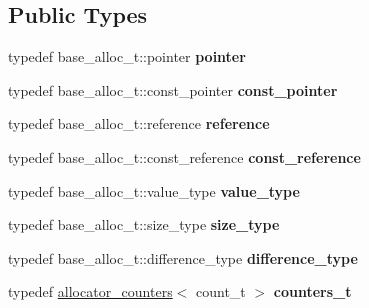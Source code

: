 \subsection*{Public Types}
\begin{DoxyCompactItemize}
\item 
\hypertarget{classstatic__counting__allocator_aac6ab247c85bf6f41751b2b67b6e6026}{}typedef base\+\_\+alloc\+\_\+t\+::pointer {\bfseries pointer}\label{classstatic__counting__allocator_aac6ab247c85bf6f41751b2b67b6e6026}

\item 
\hypertarget{classstatic__counting__allocator_a56eca0942866c703fb43023f23c78982}{}typedef base\+\_\+alloc\+\_\+t\+::const\+\_\+pointer {\bfseries const\+\_\+pointer}\label{classstatic__counting__allocator_a56eca0942866c703fb43023f23c78982}

\item 
\hypertarget{classstatic__counting__allocator_a961e4ec094176c21aa0bbc9b832dcceb}{}typedef base\+\_\+alloc\+\_\+t\+::reference {\bfseries reference}\label{classstatic__counting__allocator_a961e4ec094176c21aa0bbc9b832dcceb}

\item 
\hypertarget{classstatic__counting__allocator_a99819429593be96fde498bbcf4f76721}{}typedef base\+\_\+alloc\+\_\+t\+::const\+\_\+reference {\bfseries const\+\_\+reference}\label{classstatic__counting__allocator_a99819429593be96fde498bbcf4f76721}

\item 
\hypertarget{classstatic__counting__allocator_a5e53565fde840b1ea2cb6966b3971b5f}{}typedef base\+\_\+alloc\+\_\+t\+::value\+\_\+type {\bfseries value\+\_\+type}\label{classstatic__counting__allocator_a5e53565fde840b1ea2cb6966b3971b5f}

\item 
\hypertarget{classstatic__counting__allocator_a8503386b790708647c539ed0ab797794}{}typedef base\+\_\+alloc\+\_\+t\+::size\+\_\+type {\bfseries size\+\_\+type}\label{classstatic__counting__allocator_a8503386b790708647c539ed0ab797794}

\item 
\hypertarget{classstatic__counting__allocator_a3539ca12d1d09a133561974ff94e1528}{}typedef base\+\_\+alloc\+\_\+t\+::difference\+\_\+type {\bfseries difference\+\_\+type}\label{classstatic__counting__allocator_a3539ca12d1d09a133561974ff94e1528}

\item 
\hypertarget{classstatic__counting__allocator_ad70483f303694319cf00ea6c3b688f5b}{}typedef \hyperlink{structallocator__counters}{allocator\+\_\+counters}$<$ count\+\_\+t $>$ {\bfseries counters\+\_\+t}\label{classstatic__counting__allocator_ad70483f303694319cf00ea6c3b688f5b}

\end{DoxyCompactItemize}
